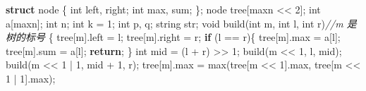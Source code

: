 \documentclass[
]{article}
\newenvironment{Shaded}{}{}
\newcommand{\CommentTok}[1]{\textcolor[rgb]{0.38,0.63,0.69}{\textit{#1}}}
\newcommand{\ControlFlowTok}[1]{\textcolor[rgb]{0.00,0.44,0.13}{\textbf{#1}}}
\newcommand{\DataTypeTok}[1]{\textcolor[rgb]{0.56,0.13,0.00}{#1}}
\newcommand{\DecValTok}[1]{\textcolor[rgb]{0.25,0.63,0.44}{#1}}
\newcommand{\KeywordTok}[1]{\textcolor[rgb]{0.00,0.44,0.13}{\textbf{#1}}}
\newcommand{\NormalTok}[1]{#1}
\newcommand{\OperatorTok}[1]{\textcolor[rgb]{0.40,0.40,0.40}{#1}}
\begin{document}
\begin{Shaded}
\begin{Highlighting}[]
\KeywordTok{struct}\NormalTok{ node}
\OperatorTok{\{}
    \DataTypeTok{int}\NormalTok{ left}\OperatorTok{,}\NormalTok{ right}\OperatorTok{;}
    \DataTypeTok{int}\NormalTok{ max}\OperatorTok{,}\NormalTok{ sum}\OperatorTok{;}
\OperatorTok{\};}
\NormalTok{node tree}\OperatorTok{[}\NormalTok{maxn }\OperatorTok{\textless{}\textless{}} \DecValTok{2}\OperatorTok{];}
\DataTypeTok{int}\NormalTok{ a}\OperatorTok{[}\NormalTok{maxn}\OperatorTok{];}
\DataTypeTok{int}\NormalTok{ n}\OperatorTok{;}
\DataTypeTok{int}\NormalTok{ k }\OperatorTok{=} \DecValTok{1}\OperatorTok{;}
\DataTypeTok{int}\NormalTok{ p}\OperatorTok{,}\NormalTok{ q}\OperatorTok{;}
\NormalTok{string str}\OperatorTok{;}
\DataTypeTok{void}\NormalTok{ build}\OperatorTok{(}\DataTypeTok{int}\NormalTok{ m}\OperatorTok{,} \DataTypeTok{int}\NormalTok{ l}\OperatorTok{,} \DataTypeTok{int}\NormalTok{ r}\OperatorTok{)}\CommentTok{//m 是 树的标号}
\OperatorTok{\{}
\NormalTok{    tree}\OperatorTok{[}\NormalTok{m}\OperatorTok{].}\NormalTok{left }\OperatorTok{=}\NormalTok{ l}\OperatorTok{;}
\NormalTok{    tree}\OperatorTok{[}\NormalTok{m}\OperatorTok{].}\NormalTok{right }\OperatorTok{=}\NormalTok{ r}\OperatorTok{;}
    \ControlFlowTok{if} \OperatorTok{(}\NormalTok{l }\OperatorTok{==}\NormalTok{ r}\OperatorTok{)\{}
\NormalTok{        tree}\OperatorTok{[}\NormalTok{m}\OperatorTok{].}\NormalTok{max }\OperatorTok{=}\NormalTok{ a}\OperatorTok{[}\NormalTok{l}\OperatorTok{];}
\NormalTok{        tree}\OperatorTok{[}\NormalTok{m}\OperatorTok{].}\NormalTok{sum }\OperatorTok{=}\NormalTok{ a}\OperatorTok{[}\NormalTok{l}\OperatorTok{];}
        \ControlFlowTok{return}\OperatorTok{;}
    \OperatorTok{\}}
    \DataTypeTok{int}\NormalTok{ mid }\OperatorTok{=} \OperatorTok{(}\NormalTok{l }\OperatorTok{+}\NormalTok{ r}\OperatorTok{)} \OperatorTok{\textgreater{}\textgreater{}} \DecValTok{1}\OperatorTok{;}
\NormalTok{    build}\OperatorTok{(}\NormalTok{m }\OperatorTok{\textless{}\textless{}} \DecValTok{1}\OperatorTok{,}\NormalTok{ l}\OperatorTok{,}\NormalTok{ mid}\OperatorTok{);}
\NormalTok{    build}\OperatorTok{(}\NormalTok{m }\OperatorTok{\textless{}\textless{}} \DecValTok{1} \OperatorTok{|} \DecValTok{1}\OperatorTok{,}\NormalTok{ mid }\OperatorTok{+} \DecValTok{1}\OperatorTok{,}\NormalTok{ r}\OperatorTok{);}
\NormalTok{    tree}\OperatorTok{[}\NormalTok{m}\OperatorTok{].}\NormalTok{max }\OperatorTok{=}\NormalTok{ max}\OperatorTok{(}\NormalTok{tree}\OperatorTok{[}\NormalTok{m }\OperatorTok{\textless{}\textless{}} \DecValTok{1}\OperatorTok{].}\NormalTok{max}\OperatorTok{,}\NormalTok{ tree}\OperatorTok{[}\NormalTok{m }\OperatorTok{\textless{}\textless{}} \DecValTok{1} \OperatorTok{|} \DecValTok{1}\OperatorTok{].}\NormalTok{max}\OperatorTok{);}

\end{Highlighting}
\end{Shaded}
\end{document}
